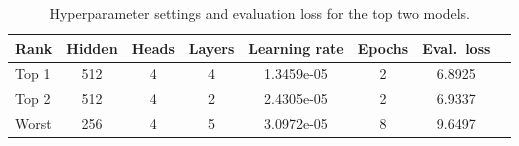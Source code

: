 \documentclass[12pt,letterpaper]{article}
\begin{document}


\begin{table}[H]
\centering
\begin{tabular}{|l|c|c|c|c|c|c|c|}
\hline
\textbf{Rank} & \textbf{Hidden} & \textbf{Heads} & \textbf{Layers} & \textbf{Learning rate} & \textbf{Epochs} & \textbf{Eval.\ loss} \\
\hline
Top 1 & 512 & 4 & 4      & 1.3459e-05 & 2 & 6.8925 \\
\hline
Top 2 & 512 & 4 & 2  & 2.4305e-05 & 2 & 6.9337 \\
\hline
Worst  & 256 & 4 & 5      & 3.0972e-05         & 8 & 9.6497\\
\hline
\end{tabular}
\caption{Hyperparameter settings and evaluation loss for the top two models.}
\label{tab:hyperparams}
\end{table}
\end{document}
